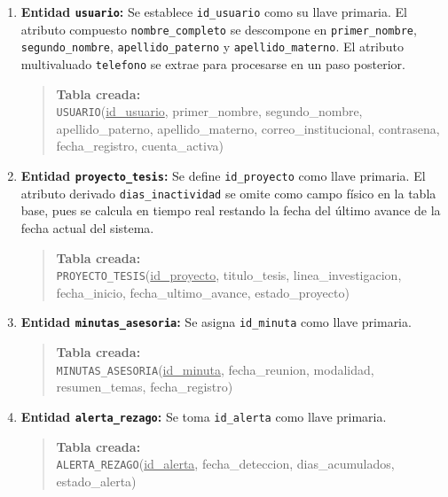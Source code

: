 \begin{enumerate}
    \item \textbf{Entidad \texttt{usuario}:} Se establece \texttt{id\_usuario} como su llave primaria. El atributo compuesto \texttt{nombre\_completo} se descompone en \texttt{primer\_nombre}, \texttt{segundo\_nombre}, \texttt{apellido\_paterno} y \texttt{apellido\_materno}. El atributo multivaluado \texttt{telefono} se extrae para procesarse en un paso posterior.
    \begin{quote}
        \textbf{Tabla creada:} \\
        \texttt{USUARIO}(\underline{id\_usuario}, primer\_nombre, segundo\_nombre, apellido\_paterno, apellido\_materno, correo\_institucional, contrasena, fecha\_registro, cuenta\_activa)
    \end{quote}

    \item \textbf{Entidad \texttt{proyecto\_tesis}:} Se define \texttt{id\_proyecto} como llave primaria. El atributo derivado \texttt{dias\_inactividad} se omite como campo físico en la tabla base, pues se calcula en tiempo real restando la fecha del último avance de la fecha actual del sistema.
    \begin{quote}
        \textbf{Tabla creada:} \\
        \texttt{PROYECTO\_TESIS}(\underline{id\_proyecto}, titulo\_tesis, linea\_investigacion, fecha\_inicio, fecha\_ultimo\_avance, estado\_proyecto)
    \end{quote}

    \item \textbf{Entidad \texttt{minutas\_asesoria}:} Se asigna \texttt{id\_minuta} como llave primaria.
    \begin{quote}
        \textbf{Tabla creada:} \\
        \texttt{MINUTAS\_ASESORIA}(\underline{id\_minuta}, fecha\_reunion, modalidad, resumen\_temas, fecha\_registro)
    \end{quote}

    \item \textbf{Entidad \texttt{alerta\_rezago}:} Se toma \texttt{id\_alerta} como llave primaria.
    \begin{quote}
        \textbf{Tabla creada:} \\
        \texttt{ALERTA\_REZAGO}(\underline{id\_alerta}, fecha\_deteccion, dias\_acumulados, estado\_alerta)
    \end{quote}
\end{enumerate}

